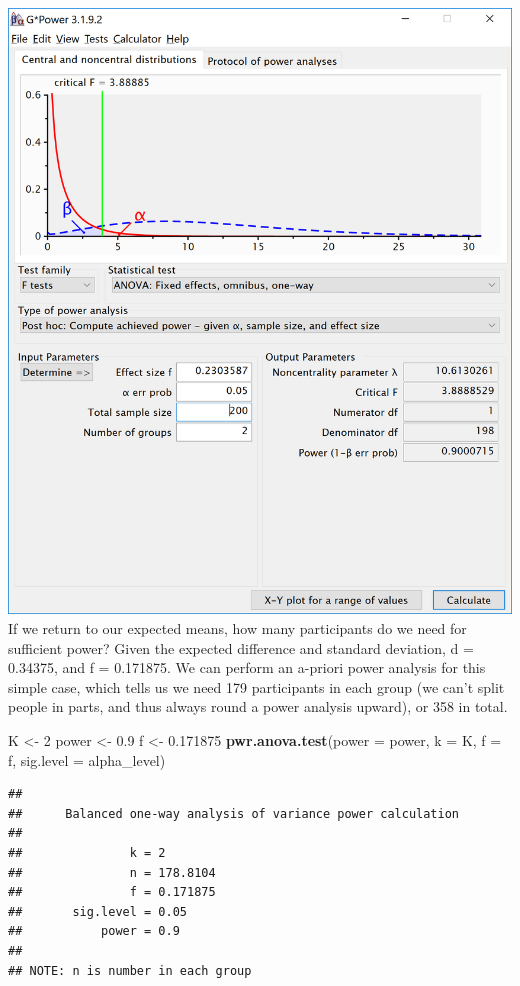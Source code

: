 \documentclass[]{book}
\newenvironment{Shaded}{\begin{snugshade}}{\end{snugshade}}
\newcommand{\DataTypeTok}[1]{\textcolor[rgb]{0.13,0.29,0.53}{#1}}
\newcommand{\DecValTok}[1]{\textcolor[rgb]{0.00,0.00,0.81}{#1}}
\newcommand{\FloatTok}[1]{\textcolor[rgb]{0.00,0.00,0.81}{#1}}
\newcommand{\KeywordTok}[1]{\textcolor[rgb]{0.13,0.29,0.53}{\textbf{#1}}}
\newcommand{\NormalTok}[1]{#1}
\newcommand{\StringTok}[1]{\textcolor[rgb]{0.31,0.60,0.02}{#1}}
\begin{document}
\includegraphics{screenshots/gpower_8.png}
If we return to our expected means, how many participants do we need for sufficient power? Given the expected difference and standard deviation, d = 0.34375, and f = 0.171875. We can perform an a-priori power analysis for this simple case, which tells us we need 179 participants in each group (we can't split people in parts, and thus always round a power analysis upward), or 358 in total.

\begin{Shaded}
\begin{Highlighting}[]
\NormalTok{K <-}\StringTok{ }\DecValTok{2}
\NormalTok{power <-}\StringTok{ }\FloatTok{0.9}
\NormalTok{f <-}\StringTok{ }\FloatTok{0.171875}
\KeywordTok{pwr.anova.test}\NormalTok{(}\DataTypeTok{power =}\NormalTok{ power,}
               \DataTypeTok{k =}\NormalTok{ K,}
               \DataTypeTok{f =}\NormalTok{ f,}
               \DataTypeTok{sig.level =}\NormalTok{ alpha_level)}
\end{Highlighting}
\end{Shaded}

\begin{verbatim}
## 
##      Balanced one-way analysis of variance power calculation 
## 
##               k = 2
##               n = 178.8104
##               f = 0.171875
##       sig.level = 0.05
##           power = 0.9
## 
## NOTE: n is number in each group
\end{verbatim}
\end{document}
